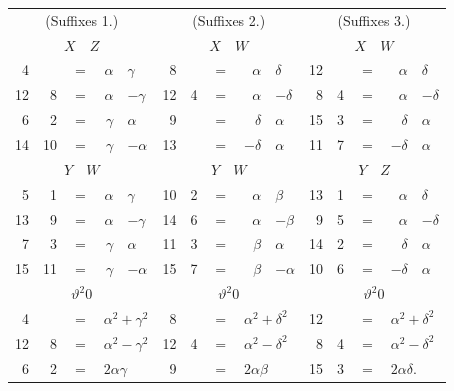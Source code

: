 \documentclass[11pt]{article}
\begin{document}
\smallskip
{\footnotesize
\begin{center}
\begin{tabular}{rrcrl|rrcrl|rrcrl}
\multicolumn{5}{c|}{(Suffixes 1.)} & \multicolumn{5}{c|}{(Suffixes 2.)} & \multicolumn{5}{c}{(Suffixes 3.)}\\
\multicolumn{5}{c|}{$X\quad Z$} & \multicolumn{5}{c|}{$X\quad W$} & \multicolumn{5}{c}{$X\quad W$}\\\hline
4  & & $=$ & $\alpha$ & $\gamma$           & 8 & & $=$ & $\alpha$ & $\delta$       & 12 & & $=$ & $\alpha$ & $\delta$\\
12 & 8 & $=$ & $\alpha$ & $-\gamma$         & 12 & 4 & $=$ & $\alpha$ & $-\delta$    & 8 & 4 & $=$ & $\alpha$ & $-\delta$\\
6  & 2 & $=$ & $\gamma$ & $\alpha$          & 9 & & $=$ & $\delta$ & $\alpha$        & 15 & 3 & $=$ & $\delta$ & $\alpha$\\
14 & 10 & $=$ & $\gamma$ & $-\alpha$       & 13 & & $=$ & $-\delta$& $\alpha$        & 11 & 7 & $=$ & $-\delta$ & $\alpha$\\
\multicolumn{5}{c|}{$Y\quad W$} & \multicolumn{5}{c|}{$Y\quad W$} & \multicolumn{5}{c}{$Y\quad Z$}\\
5  & 1 & $=$ & $\alpha$ & $\gamma$          & 10 & 2 & $=$ & $\alpha$ & $\beta$       & 13 & 1 & $=$ & $\alpha$ & $\delta$\\
13 & 9 & $=$ & $\alpha$ & $-\gamma$        & 14 & 6 & $=$ & $\alpha$ & $-\beta$       & 9 & 5 & $=$ & $\alpha$ & $-\delta$\\
7  & 3 & $=$ & $\gamma$ & $\alpha$          & 11 & 3 & $=$ & $\beta$ & $\alpha$       & 14 & 2 & $=$ & $\delta$ & $\alpha$\\
15 & 11 & $=$ & $\gamma$ & $-\alpha$       & 15 & 7 & $=$ & $\beta$ & $-\alpha$      & 10 & 6 & $=$ & $-\delta$ & $\alpha$\\\hline
\multicolumn{5}{c|}{$\vartheta^2 0$} & \multicolumn{5}{c|}{$\vartheta^2 0$} & \multicolumn{5}{c}{$\vartheta^2 0$}\\
4  & & $=$ & \multicolumn{2}{l|}{$\alpha^2 + \gamma^2$} & 8 & & $=$ & \multicolumn{2}{l|}{$\alpha^2 + \delta^2$} & 12 & & $=$ & \multicolumn{2}{l}{$\alpha^2 + \delta^2$}\\
12 & 8 & $=$ & \multicolumn{2}{l|}{$\alpha^2 - \gamma^2$} & 12 & 4 & $=$ & \multicolumn{2}{l|}{$\alpha^2 - \delta^2$} & 8 & 4 & $=$ & \multicolumn{2}{l}{$\alpha^2 - \delta^2$}\\
6  & 2 & $=$ & \multicolumn{2}{l|}{$2\alpha\gamma$}  & 9 & & $=$ & \multicolumn{2}{l|}{$2\alpha\beta$} & 15 & 3 & $=$ & \multicolumn{2}{l}{$2\alpha\delta$.}\\
\end{tabular}
\end{center}
}
\end{document}
